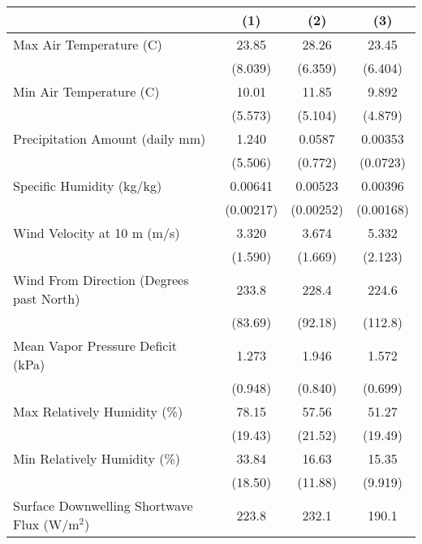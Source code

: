 \begin{tabular}{l*{3}{c}}
\hline\hline
                                             &\multicolumn{1}{c}{(1)}&\multicolumn{1}{c}{(2)}&\multicolumn{1}{c}{(3)}\\
\hline
Max Air Temperature (C)                      &       23.85&       28.26&       23.45\\
                                             &     (8.039)&     (6.359)&     (6.404)\\
[1em]
Min Air Temperature (C)                      &       10.01&       11.85&       9.892\\
                                             &     (5.573)&     (5.104)&     (4.879)\\
[1em]
Precipitation Amount (daily mm)              &       1.240&      0.0587&     0.00353\\
                                             &     (5.506)&     (0.772)&    (0.0723)\\
[1em]
Specific Humidity (kg/kg)                    &     0.00641&     0.00523&     0.00396\\
                                             &   (0.00217)&   (0.00252)&   (0.00168)\\
[1em]
Wind Velocity at 10 m (m/s)                  &       3.320&       3.674&       5.332\\
                                             &     (1.590)&     (1.669)&     (2.123)\\
[1em]
Wind From Direction (Degrees past North)     &       233.8&       228.4&       224.6\\
                                             &     (83.69)&     (92.18)&     (112.8)\\
[1em]
Mean Vapor Pressure Deficit (kPa)            &       1.273&       1.946&       1.572\\
                                             &     (0.948)&     (0.840)&     (0.699)\\
[1em]
Max Relatively Humidity (\%)                 &       78.15&       57.56&       51.27\\
                                             &     (19.43)&     (21.52)&     (19.49)\\
[1em]
Min Relatively Humidity (\%)                 &       33.84&       16.63&       15.35\\
                                             &     (18.50)&     (11.88)&     (9.919)\\
[1em]
Surface Downwelling Shortwave Flux (W/m$^2$) &       223.8&       232.1&       190.1\\

\end{tabular}
